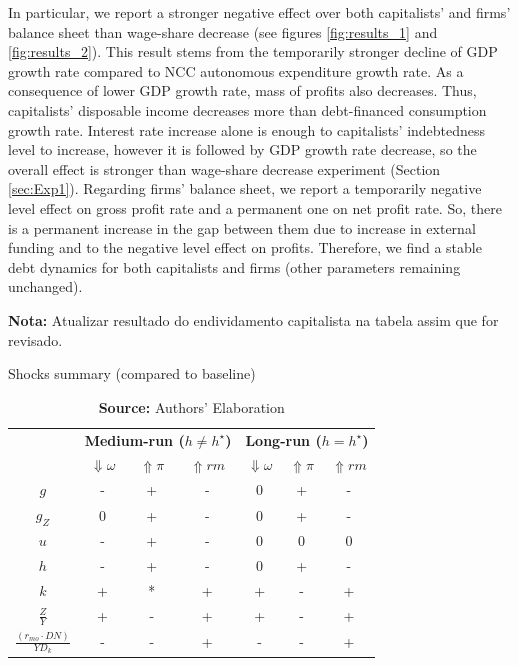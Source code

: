 \documentclass[11pt]{article}
\begin{document}
In particular, we report a stronger negative effect over both capitalists' and firms' balance sheet than wage-share decrease (see figures \ref{fig:results_1} and \ref{fig:results_2}).
This result stems from the temporarily stronger decline of GDP growth rate compared to NCC autonomous expenditure growth rate.
As a consequence of lower GDP growth rate, mass of profits also decreases.
Thus, capitalists' disposable income decreases more than debt-financed consumption growth rate.
Interest rate increase alone is enough to capitalists' indebtedness level to increase, however it is followed by GDP growth rate decrease, so the overall effect is stronger than wage-share decrease experiment (Section \ref{sec:Exp1}).
Regarding firms' balance sheet, we report a temporarily negative level effect on gross profit rate and a permanent one on net profit rate. 
So, there is a permanent increase in the gap between them due to increase in external funding and to the negative level effect on profits.
Therefore, we find a stable debt dynamics for both capitalists and firms (other parameters remaining unchanged).

\textbf{Nota:} Atualizar resultado do endividamento capitalista na tabela assim que for revisado.

\begin{table}[H]
	\centering
	\caption{Shocks summary (compared to baseline)}
	\label{ResumoChoques}
		\begin{tabular}{c|c|c|c||c|c|c}
			\hline\hline
			\multirow{2}{*}{} & \multicolumn{3}{c||}{\textbf{Medium-run ($h \neq h^\star$)}} & \multicolumn{3}{c}{\textbf{Long-run ($h = h^\star$)}} \\ \cline{2-7} 
			&  \textbf{$\Downarrow \omega$} & \textbf{$\Uparrow \pi$} & \textbf{$\Uparrow rm$} &  \textbf{$\Downarrow \omega$} & \textbf{$\Uparrow \pi$} & \textbf{$\Uparrow rm$} \\ \hline
			\textbf{$g$}  & - & + & - & 0 & + & - \\ \hline
			\textbf{$g_Z$}  & 0 & + & -  & 0 & + & - \\ \hline
			\textbf{$u$}  & - & + & -  & 0 & 0 & 0 \\ \hline
			\textbf{$h$}  & - & + & -  & 0 & + & - \\ \hline
			\textbf{$k$}  & + & * & +  & + & - & + \\ \hline
			\textbf{$\frac{Z}{Y}$}  & + & - & +  & + & - & + \\ \hline
			\textit{$\frac{(r_{mo}\cdot DN)}{YD_k}$}  & - & - & +  & - & - & + \\ \hline\hline
		\end{tabular}%
	\caption*{\textbf{Source:} Authors' Elaboration}
\end{table}
\end{document}

